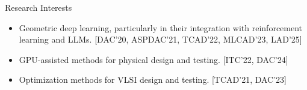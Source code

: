 
\begin{rSection}{Research Interests}
    
\begin{itemize}
    \item Geometric deep learning, particularly in their integration with reinforcement learning and LLMs. {[DAC'20, ASPDAC'21, TCAD'22, MLCAD'23, LAD'25]}
    \item GPU-assisted methods for physical design and testing. {[ITC'22, DAC'24]}
    \item Optimization methods for VLSI design and testing. {[TCAD'21, DAC'23]}
\end{itemize}
\end{rSection}




